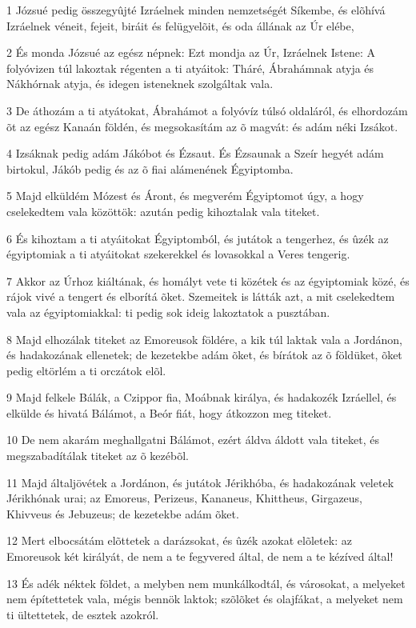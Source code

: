 \par 1 Józsué pedig összegyûjté Izráelnek minden nemzetségét Síkembe, és elõhívá Izráelnek véneit, fejeit, biráit és felügyelõit, és oda állának az Úr elébe,
\par 2 És monda Józsué az egész népnek: Ezt mondja az Úr, Izráelnek Istene: A folyóvizen túl lakoztak régenten a ti atyáitok: Tháré, Ábrahámnak atyja és Nákhórnak atyja, és idegen isteneknek szolgáltak vala.
\par 3 De áthozám a ti atyátokat, Ábrahámot a folyóvíz túlsó oldaláról, és elhordozám õt az egész Kanaán földén, és megsokasítám az õ magvát: és adám néki Izsákot.
\par 4 Izsáknak pedig adám Jákóbot és Ézsaut. És Ézsaunak a Szeír hegyét adám birtokul,  Jákób pedig és az õ fiai alámenének Égyiptomba.
\par 5 Majd elküldém Mózest és Áront, és megverém Égyiptomot úgy, a hogy cselekedtem vala közöttök: azután pedig kihoztalak vala titeket.
\par 6 És kihoztam a ti atyáitokat Égyiptomból, és jutátok a tengerhez, és ûzék az égyiptomiak a ti atyáitokat szekerekkel és lovasokkal a Veres tengerig.
\par 7 Akkor az Úrhoz kiáltának, és homályt vete ti közétek és az égyiptomiak közé, és rájok vivé a tengert és elborítá õket. Szemeitek is látták azt, a mit cselekedtem vala  az égyiptomiakkal: ti pedig sok ideig lakoztatok a pusztában.
\par 8 Majd elhozálak titeket az Emoreusok földére, a kik túl laktak vala a Jordánon, és hadakozának ellenetek; de kezetekbe adám õket, és bírátok az õ földüket, õket pedig eltörlém a ti orczátok elõl.
\par 9 Majd felkele Bálák, a Czippor fia, Moábnak királya, és hadakozék Izráellel, és elkülde és hivatá Bálámot, a Beór fiát, hogy átkozzon meg titeket.
\par 10 De nem akarám meghallgatni Bálámot, ezért áldva áldott vala  titeket, és megszabadítálak titeket az õ kezébõl.
\par 11 Majd általjövétek a Jordánon, és jutátok Jérikhóba,  és hadakozának veletek Jérikhónak urai; az Emoreus, Perizeus, Kananeus, Khittheus, Girgazeus, Khivveus és Jebuzeus; de kezetekbe adám õket.
\par 12 Mert elbocsátám elõttetek a darázsokat, és ûzék azokat elõletek: az Emoreusok két királyát, de nem a te fegyvered által,  de nem a te kézíved által!
\par 13 És adék néktek földet, a melyben nem munkálkodtál, és városokat, a melyeket nem építettetek vala, mégis bennök laktok; szõlõket és olajfákat, a melyeket nem ti ültettetek, de esztek azokról.
